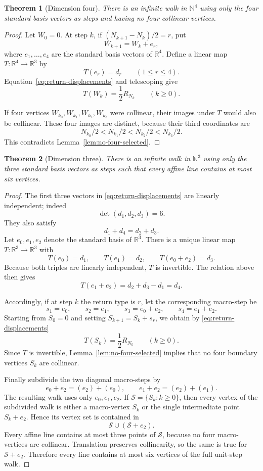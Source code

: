 \documentclass[11pt]{article}
\newtheorem*{theorem}{Theorem}
\begin{document}
\begin{theorem}[Dimension four]\label{thm:dimension-four}
There is an infinite walk in $\mathbb N^4$ using only the four standard
basis vectors as steps and having no four collinear vertices.
\end{theorem}

\begin{proof}
Let $W_0=0$.  At step $k$, if $(N_{k+1}-N_k)/2=r$, put
\[
 W_{k+1}=W_k+e_r,
\]
where $e_1,\ldots,e_4$ are the standard basis vectors of $\mathbb R^4$.
Define a linear map $T:\mathbb R^4\to\mathbb R^3$ by
\[
 T(e_r)=d_r\qquad(1\le r\le4).
\]
Equation~\eqref{eq:return-displacements} and telescoping give
\[
 T(W_k)=\frac12R_{N_k}\qquad(k\ge0).
\]

If four vertices $W_{k_0},W_{k_1},W_{k_2},W_{k_3}$ were collinear, their
images under $T$ would also be collinear.  These four images are distinct,
because their third coordinates are
\[
 N_{k_0}/2<N_{k_1}/2<N_{k_2}/2<N_{k_3}/2.
\]
This contradicts Lemma~\ref{lem:no-four-selected}.
\end{proof}

\begin{theorem}[Dimension three]\label{thm:dimension-three}
There is an infinite walk in $\mathbb N^3$ using only the three standard
basis vectors as steps such that every affine line contains at most six
vertices.
\end{theorem}

\begin{proof}
The first three vectors in \eqref{eq:return-displacements} are linearly
independent; indeed
\[
 \det(d_1,d_2,d_3)=6.
\]
They also satisfy
\[
 d_1+d_4=d_2+d_3.
\]
Let $e_0,e_1,e_2$ denote the standard basis of $\mathbb R^3$.  There is a
unique linear map $T:\mathbb R^3\to\mathbb R^3$ with
\[
 T(e_0)=d_1,\qquad
 T(e_1)=d_2,\qquad
 T(e_0+e_2)=d_3.
\]
Because both triples are linearly independent, $T$ is invertible.  The
relation above then gives
\[
 T(e_1+e_2)=d_2+d_3-d_1=d_4.
\]

Accordingly, if at step $k$ the return type is $r$, let the corresponding
macro-step be
\[
 s_1=e_0,\qquad s_2=e_1,\qquad
 s_3=e_0+e_2,\qquad s_4=e_1+e_2.
\]
Starting from $S_0=0$ and setting $S_{k+1}=S_k+s_r$, we obtain by
\eqref{eq:return-displacements}
\[
 T(S_k)=\frac12R_{N_k}\qquad(k\ge0).
\]
Since $T$ is invertible, Lemma~\ref{lem:no-four-selected} implies that no
four boundary vertices $S_k$ are collinear.

Finally subdivide the two diagonal macro-steps by
\[
 e_0+e_2=(e_2)+(e_0),\qquad
 e_1+e_2=(e_2)+(e_1).
\]
The resulting walk uses only $e_0,e_1,e_2$.  If
\(\mathcal S=\{S_k:k\ge0\}\), then every vertex of the subdivided walk is
either a macro-vertex $S_k$ or the single intermediate point $S_k+e_2$.
Hence its vertex set is contained in
\[
 \mathcal S\cup(\mathcal S+e_2).
\]
Every affine line contains at most three points of $\mathcal S$, because no
four macro-vertices are collinear.  Translation preserves collinearity, so
the same is true for $\mathcal S+e_2$.  Therefore every line contains at
most six vertices of the full unit-step walk.
\end{proof}
\end{document}

